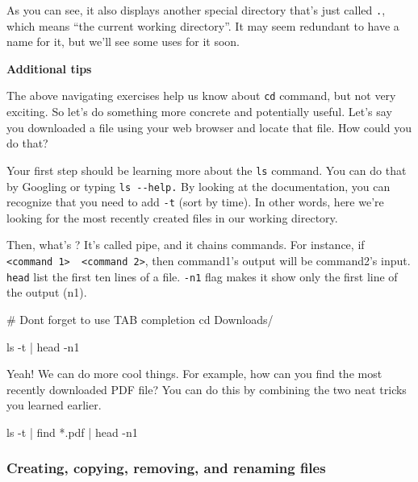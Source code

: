 \documentclass[
  letterpaper,
  DIV=11,
  numbers=noendperiod]{scrreprt}
\newenvironment{Shaded}{\begin{snugshade}}{\end{snugshade}}
\newcommand{\AttributeTok}[1]{\textcolor[rgb]{0.40,0.45,0.13}{#1}}
\newcommand{\BuiltInTok}[1]{\textcolor[rgb]{0.00,0.23,0.31}{#1}}
\newcommand{\CommentTok}[1]{\textcolor[rgb]{0.37,0.37,0.37}{#1}}
\newcommand{\FunctionTok}[1]{\textcolor[rgb]{0.28,0.35,0.67}{#1}}
\newcommand{\KeywordTok}[1]{\textcolor[rgb]{0.00,0.23,0.31}{#1}}
\newcommand{\NormalTok}[1]{\textcolor[rgb]{0.00,0.23,0.31}{#1}}
\newcommand{\PreprocessorTok}[1]{\textcolor[rgb]{0.68,0.00,0.00}{#1}}
\begin{document}
As you can see, it also displays another special directory that's just
called \texttt{.}, which means ``the current working directory''. It may
seem redundant to have a name for it, but we'll see some uses for it
soon.

\textbf{Additional tips}

The above navigating exercises help us know about \texttt{cd} command,
but not very exciting. So let's do something more concrete and
potentially useful. Let's say you downloaded a file using your web
browser and locate that file. How could you do that?

Your first step should be learning more about the \texttt{ls} command.
You can do that by Googling or typing \texttt{ls\ -\/-help.} By looking
at the documentation, you can recognize that you need to add \texttt{-t}
(sort by time). In other words, here we're looking for the most recently
created files in our working directory.

Then, what's \texttt{\textbar{}}? It's called pipe, and it chains
commands. For instance, if
\texttt{\textless{}command\ 1\textgreater{}\ \textbar{}\ \textless{}command\ 2\textgreater{}},
then command1's output will be command2's input. \texttt{head} list the
first ten lines of a file. \texttt{-n1} flag makes it show only the
first line of the output (n1).

\begin{Shaded}
\begin{Highlighting}[]
\CommentTok{\# Don\textquotesingle{}t forget to use TAB completion}
\BuiltInTok{cd}\NormalTok{ Downloads/ }

\FunctionTok{ls} \AttributeTok{{-}t} \KeywordTok{|} \FunctionTok{head} \AttributeTok{{-}n1}
\end{Highlighting}
\end{Shaded}

Yeah! We can do more cool things. For example, how can you find the most
recently downloaded PDF file? You can do this by combining the two neat
tricks you learned earlier.

\begin{Shaded}
\begin{Highlighting}[]
\FunctionTok{ls} \AttributeTok{{-}t} \KeywordTok{|} \FunctionTok{find} \PreprocessorTok{*}\NormalTok{.pdf }\KeywordTok{|} \FunctionTok{head} \AttributeTok{{-}n1} 
\end{Highlighting}
\end{Shaded}

\hypertarget{creating-copying-removing-and-renaming-files}{%
\subsubsection*{Creating, copying, removing, and renaming
files}\label{creating-copying-removing-and-renaming-files}}
\end{document}
